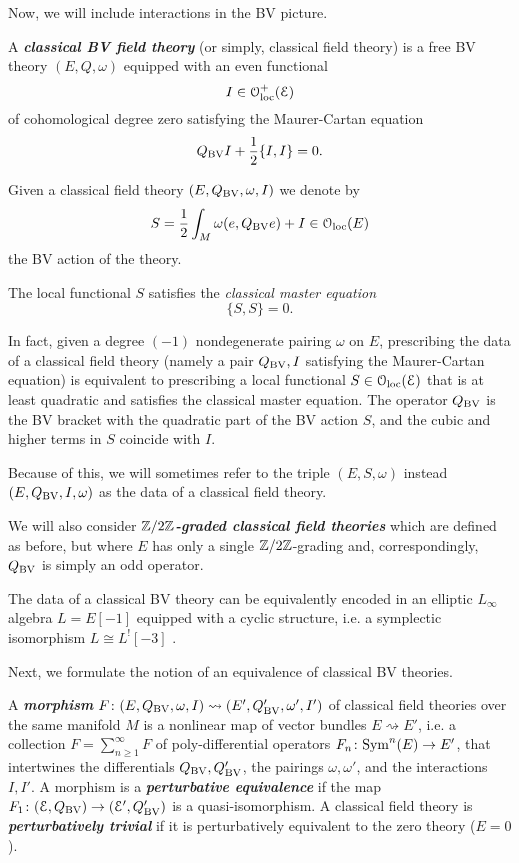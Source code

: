 \documentclass[10pt, oneside]{article}
\newcommand{\defterm}[1]{\textbf{\emph{#1}}}
\begin{document}
Now, we will include interactions in the BV picture. 

\begin{definition}
A \defterm{classical BV field theory} (or simply, classical field theory) is a free BV theory $(E, Q, \omega)$ equipped with an even functional
\[I \in \mathcal{O}_{\rm loc}^+(\mathcal E)\]
of cohomological degree zero satisfying the Maurer-Cartan equation
\[Q_{\mathrm{BV}} I + \frac{1}{2} \{I,I\} = 0 .\]
\end{definition}

Given a classical field theory $(E, Q_{\mathrm{BV}}, \omega, I)$ we denote by
\[S = \frac{1}{2} \int_M \omega(e, Q_{\mathrm{BV}} e) + I\in \mathcal{O}_{\rm loc}(E)\]
the BV action of the theory.

The local functional $S$ satisfies the {\em classical master equation} \[\{S, S\} = 0.\] 

In fact, given a degree $(-1)$ nondegenerate pairing $\omega$ on $E$, prescribing the data of a classical field theory (namely a pair $Q_{\mathrm{BV}}, I$ satisfying the Maurer-Cartan equation) is equivalent to prescribing a local functional $S \in \mathcal{O}_{\rm loc}(\mathcal E)$ that is at least quadratic and satisfies the classical master equation.
The operator $Q_{\mathrm{BV}}$ is the BV bracket with the quadratic part of the BV action $S$, and the cubic and higher terms in $S$ coincide with $I$.

Because of this, we will sometimes refer to the triple $(E, S, \omega)$ instead $(E, Q_{\mathrm{BV}}, I, \omega)$ as the data of a classical field theory.

\begin{remark}
We will also consider \defterm{$\mathbb Z/2\mathbb Z$-graded classical field theories} which are defined as before, but where $E$ has only a single $\mathbb Z/2\mathbb Z$-grading and, correspondingly, $Q_{\mathrm{BV}}$ is simply an odd operator.
\end{remark}

\begin{remark}
The data of a classical BV theory can be equivalently encoded in an elliptic $L_\infty$ algebra $L=E[-1]$ equipped with a cyclic structure, i.e. a symplectic isomorphism $L\cong L^![-3]$ \cite[Chapter 5.4]{Book2}. 
\end{remark}

Next, we formulate the notion of an equivalence of classical BV theories. 

\begin{definition}
A \defterm{morphism} $F\colon (E, Q_{\mathrm{BV}}, \omega, I) \rightsquigarrow (E', Q_{\mathrm{BV}}', \omega', I')$ of classical field theories over the same manifold $M$ is a nonlinear map of vector bundles $E\rightsquigarrow E'$, i.e. a collection $F=\sum_{n\geq 1}^\infty F$ of poly-differential operators $F_n\colon {\rm Sym}^n(E)\rightarrow E'$, that intertwines the differentials $Q_{\mathrm{BV}}, Q_{\mathrm{BV}}'$, the pairings $\omega, \omega'$, and the interactions $I,I'$. A morphism is a \defterm{perturbative equivalence} if the map $F_1\colon (\mathcal E, Q_{\mathrm{BV}})\rightarrow (\mathcal E', Q_{\mathrm{BV}}')$ is a quasi-isomorphism. A classical field theory is \defterm{perturbatively trivial} if it is perturbatively equivalent to the zero theory ($E = 0$).
\end{definition}
\end{document}
